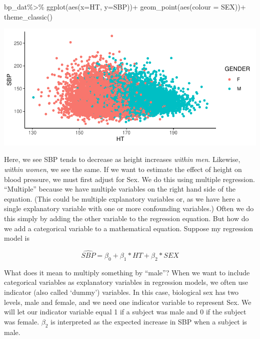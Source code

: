 \documentclass[
]{book}
\newenvironment{Shaded}{\begin{snugshade}}{\end{snugshade}}
\newcommand{\AttributeTok}[1]{\textcolor[rgb]{0.77,0.63,0.00}{#1}}
\newcommand{\FunctionTok}[1]{\textcolor[rgb]{0.00,0.00,0.00}{#1}}
\newcommand{\NormalTok}[1]{#1}
\newcommand{\SpecialCharTok}[1]{\textcolor[rgb]{0.00,0.00,0.00}{#1}}
\newcommand{\StringTok}[1]{\textcolor[rgb]{0.31,0.60,0.02}{#1}}
\begin{document}
\begin{Shaded}
\begin{Highlighting}[]
\NormalTok{bp\_dat}\SpecialCharTok{\%\textgreater{}\%}
  \FunctionTok{ggplot}\NormalTok{(}\FunctionTok{aes}\NormalTok{(}\AttributeTok{x=}\StringTok{\textasciigrave{}}\AttributeTok{HT}\StringTok{\textasciigrave{}}\NormalTok{,}
             \AttributeTok{y=}\StringTok{\textasciigrave{}}\AttributeTok{SBP}\StringTok{\textasciigrave{}}\NormalTok{))}\SpecialCharTok{+}
  \FunctionTok{geom\_point}\NormalTok{(}\FunctionTok{aes}\NormalTok{(}\AttributeTok{colour =}\NormalTok{ SEX))}\SpecialCharTok{+}
  \FunctionTok{theme\_classic}\NormalTok{()}
\end{Highlighting}
\end{Shaded}

\includegraphics{MA206supplement_files/figure-latex/unnamed-chunk-5-1.pdf}

Here, we see SBP tends to decrease as height increases \emph{within men}. Likewise, \emph{within women}, we see the same. If we want to estimate the effect of height on blood pressure, we must first adjust for Sex. We do this using multiple regression. ``Multiple'' because we have multiple variables on the right hand side of the equation. (This could be multiple explanatory variables or, as we have here a single explanatory variable with one or more confounding variables.) Often we do this simply by adding the other variable to the regression equation. But how do we add a categorical variable to a mathematical equation. Suppose my regression model is

\[\widehat{SBP}=\beta_0+\beta_1*HT+\beta_2*SEX\]

What does it mean to multiply something by ``male''? When we want to include categorical variables as explanatory variables in regression models, we often use indicator (also called `dummy') variables. In this case, biological sex has two levels, male and female, and we need one indicator variable to represent Sex. We will let our indicator variable equal 1 if a subject was male and 0 if the subject was female. \(\beta_2\) is interpreted as the expected increase in SBP when a subject is male.
\end{document}
